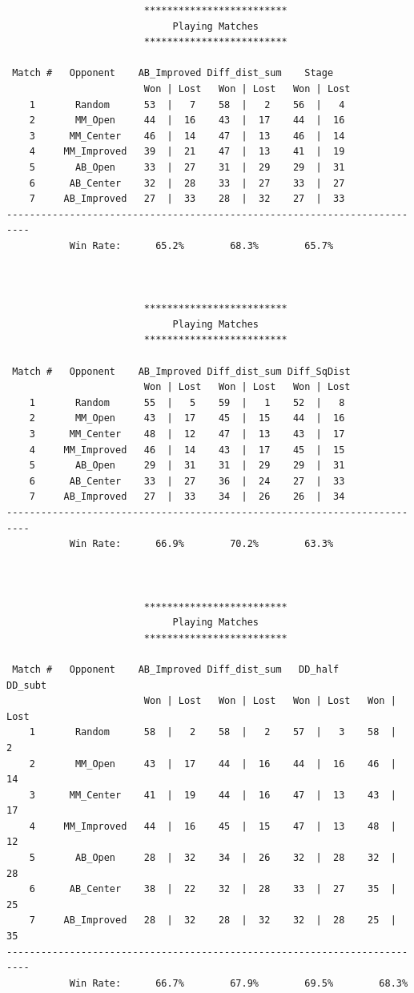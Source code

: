 \documentclass[a4paper,12pt]{article}
\begin{document}
\begin{verbatim}
                        *************************                         
                             Playing Matches                              
                        *************************                         

 Match #   Opponent    AB_Improved Diff_dist_sum    Stage    
                        Won | Lost   Won | Lost   Won | Lost 
    1       Random      53  |   7    58  |   2    56  |   4  
    2       MM_Open     44  |  16    43  |  17    44  |  16  
    3      MM_Center    46  |  14    47  |  13    46  |  14  
    4     MM_Improved   39  |  21    47  |  13    41  |  19  
    5       AB_Open     33  |  27    31  |  29    29  |  31  
    6      AB_Center    32  |  28    33  |  27    33  |  27  
    7     AB_Improved   27  |  33    28  |  32    27  |  33  
--------------------------------------------------------------------------
           Win Rate:      65.2%        68.3%        65.7%    



                        *************************                         
                             Playing Matches                              
                        *************************                         

 Match #   Opponent    AB_Improved Diff_dist_sum Diff_SqDist 
                        Won | Lost   Won | Lost   Won | Lost 
    1       Random      55  |   5    59  |   1    52  |   8  
    2       MM_Open     43  |  17    45  |  15    44  |  16  
    3      MM_Center    48  |  12    47  |  13    43  |  17  
    4     MM_Improved   46  |  14    43  |  17    45  |  15  
    5       AB_Open     29  |  31    31  |  29    29  |  31  
    6      AB_Center    33  |  27    36  |  24    27  |  33  
    7     AB_Improved   27  |  33    34  |  26    26  |  34  
--------------------------------------------------------------------------
           Win Rate:      66.9%        70.2%        63.3%    



                        *************************                         
                             Playing Matches                              
                        *************************                         

 Match #   Opponent    AB_Improved Diff_dist_sum   DD_half      DD_subt   
                        Won | Lost   Won | Lost   Won | Lost   Won | Lost 
    1       Random      58  |   2    58  |   2    57  |   3    58  |   2  
    2       MM_Open     43  |  17    44  |  16    44  |  16    46  |  14  
    3      MM_Center    41  |  19    44  |  16    47  |  13    43  |  17  
    4     MM_Improved   44  |  16    45  |  15    47  |  13    48  |  12  
    5       AB_Open     28  |  32    34  |  26    32  |  28    32  |  28  
    6      AB_Center    38  |  22    32  |  28    33  |  27    35  |  25  
    7     AB_Improved   28  |  32    28  |  32    32  |  28    25  |  35  
--------------------------------------------------------------------------
           Win Rate:      66.7%        67.9%        69.5%        68.3%    



\end{verbatim}
\end{document}
